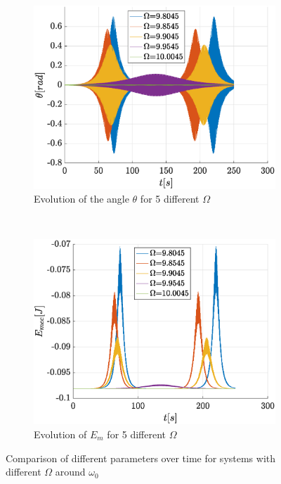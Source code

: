 \documentclass[a4paper,12pt,twoside]{article}
\begin{document}
\begin{figure}[h!]
	\begin{subfigure}[t]{0.6\textwidth}
		\includegraphics[width=\textwidth]{graphs/c_comptheta.eps}
		\caption{Evolution of the angle $\theta$ for 5 different $\Omega$}
		\label{fig:c-comptheta}
	\end{subfigure}
	~
	\begin{subfigure}[t]{0.52\textwidth}
		\includegraphics[width=\textwidth]{graphs/c_compemec.eps}
		\caption{Evolution of $E_m$ for 5 different $\Omega$}
		\label{fig:c-compemec}
	\end{subfigure}
	\caption{Comparison of different parameters over time for systems with different $\Omega$ around $\omega_0$}
\label{fig:c-comp}
\end{figure}
\end{document}
